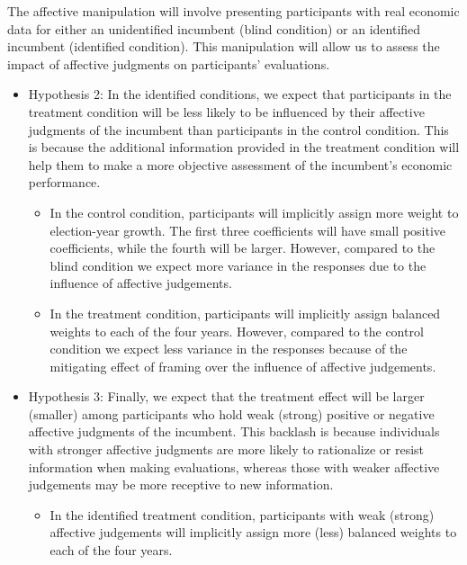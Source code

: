 \documentclass[
]{article}
\providecommand{\tightlist}{%
  \setlength{\itemsep}{0pt}\setlength{\parskip}{0pt}}
\begin{document}
The affective manipulation will involve presenting participants with
real economic data for either an unidentified incumbent (blind
condition) or an identified incumbent (identified condition). This
manipulation will allow us to assess the impact of affective judgments
on participants' evaluations.

\begin{itemize}
\tightlist
\item
  Hypothesis 2: In the identified conditions, we expect that
  participants in the treatment condition will be less likely to be
  influenced by their affective judgments of the incumbent than
  participants in the control condition. This is because the additional
  information provided in the treatment condition will help them to make
  a more objective assessment of the incumbent's economic performance.

  \begin{itemize}
  \tightlist
  \item
    In the control condition, participants will implicitly assign more
    weight to election-year growth. The first three coefficients will
    have small positive coefficients, while the fourth will be larger.
    However, compared to the blind condition we expect more variance in
    the responses due to the influence of affective judgements.
  \item
    In the treatment condition, participants will implicitly assign
    balanced weights to each of the four years. However, compared to the
    control condition we expect less variance in the responses because
    of the mitigating effect of framing over the influence of affective
    judgements.
  \end{itemize}
\item
  Hypothesis 3: Finally, we expect that the treatment effect will be
  larger (smaller) among participants who hold weak (strong) positive or
  negative affective judgments of the incumbent. This backlash is
  because individuals with stronger affective judgments are more likely
  to rationalize or resist information when making evaluations, whereas
  those with weaker affective judgements may be more receptive to new
  information.

  \begin{itemize}
  \tightlist
  \item
    In the identified treatment condition, participants with weak
    (strong) affective judgements will implicitly assign more (less)
    balanced weights to each of the four years.
  \end{itemize}
\end{itemize}
\end{document}
